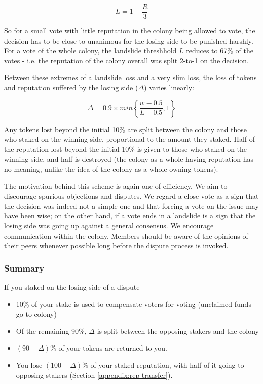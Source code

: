 \[
L = 1 - \frac{R}{3}
\]

So for a small vote with little reputation in the colony being allowed to vote, the decision has to be close to unanimous for the losing side to be punished harshly. For a vote of the whole colony, the landslide threshhold $L$ reduces to 67\% of the votes - i.e. the reputation of the colony overall was split 2-to-1 on the decision.

Between these extremes of a landslide loss and a very slim loss, the loss of tokens and reputation suffered by the losing side ($\Delta$) varies linearly:

\[
 \Delta = 0.9 \times min \left\lbrace \frac{w-0.5}{L-0.5}, 1 \right\rbrace
\]


Any tokens lost beyond the initial 10\% are split between the colony and those who staked on the winning side, proportional to the amount they staked. Half of the reputation lost beyond the initial 10\% is given to those who staked on the winning side, and half is destroyed (the colony as a whole having reputation has no meaning, unlike the idea of the colony as a whole owning tokens).

The motivation behind this scheme is again one of efficiency. We aim to discourage spurious objections and disputes. We regard a close vote as a sign that the decision was indeed not a simple one and that forcing a vote on the issue may have been wise; on the other hand, if a vote ends in a landslide is a sign that the losing side was going up against a general consensus. We encourage communication within the colony. Members should be aware of the opinions of their peers whenever possible long before the dispute process is invoked.

\subsubsection*{Summary}
If you staked on the losing side of a dispute
\begin{itemize}
 \item 10\% of your stake is used to compensate voters for voting (unclaimed funds go to colony)
 \item Of the remaining 90\%, $\Delta$ is split between the opposing stakers and the colony
 \item $(90-\Delta)\%$ of your tokens are returned to you.
 \item You lose $(100-\Delta)\%$ of your staked reputation, with half of it going to opposing stakers (Section \ref{appendix:rep-transfer}).
\end{itemize}


